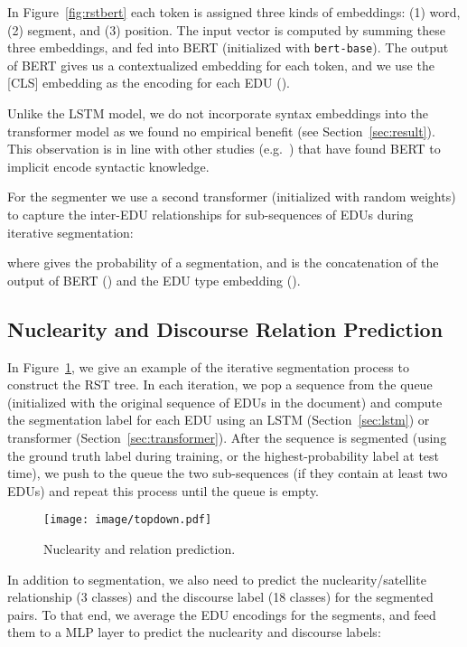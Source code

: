 \documentclass[11pt,a4paper]{article}
\newcommand{\secref}[2][]{Section#1~\ref{sec:#2}}
\newcommand{\figref}[2][]{Figure#1~\ref{fig:#2}}
\begin{document}
In \figref{rstbert} each token is assigned three kinds of embeddings: (1) word, (2) segment,
and (3) position. The input vector is computed by summing these three
embeddings, and fed into BERT (initialized with \texttt{bert-base}).
The output of BERT gives us a contextualized embedding for each token,
and we use the [CLS] embedding as the encoding for each EDU ().


Unlike the LSTM model, we do not incorporate syntax embeddings into the
transformer model as we found no empirical benefit (see
\secref{result}).  This observation is in line with other studies (e.g.\
\citet{jawahar-etal-2019-bert}) that have found BERT to implicit encode
syntactic knowledge.



For the segmenter we use a second transformer (initialized with random
weights) to capture the inter-EDU relationships for sub-sequences of
EDUs during iterative segmentation:

where  gives the probability of a segmentation, and
  is the concatenation of the output of BERT () and
the EDU type embedding ().



\subsection{Nuclearity and Discourse Relation Prediction}

In \figref{topdown}, we give an example of the iterative segmentation
process to construct the RST tree. In each iteration, we pop a sequence
from the queue (initialized with the original sequence of EDUs in the
document) and compute the segmentation label for each EDU using an LSTM
(\secref{lstm}) or transformer (\secref{transformer}). After the
sequence is segmented (using the ground truth label during training, or
the highest-probability label at test time), we push to the queue the
two sub-sequences (if they contain at least two EDUs) and repeat this
process until the queue is empty.

\begin{figure}[]
	\centering
	\texttt{[image: image/topdown.pdf]}
	\caption{Nuclearity and relation prediction.}
	\label{fig:topdown}
\end{figure}



In addition to segmentation, we also need to predict the
nuclearity/satellite relationship (3 classes) and the discourse label
(18 classes) for the segmented pairs. To that end, we average the EDU
encodings for the segments, and feed them to a MLP layer to predict the
nuclearity and discourse labels:
\end{document}
